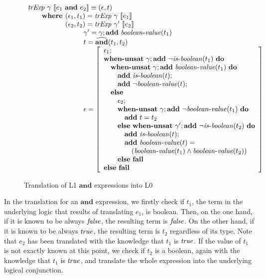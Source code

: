 \begin{figure}
\[
\begin{array}{l}
\trExp{\gamma}{\andE{e_1}{e_2}} \equiv (\epsilon, t)\\
\qquad \textbf{where }(\epsilon_1, t_1) = \trExp{\gamma}{e_1}\\
\qquad \phantom{\textbf{where }}(\epsilon_2, t_2) = \trExp{\gamma'}{e_2}\\
\qquad\qquad\qquad\qquad \gamma' = \gamma;\addE~\booleanvalue{t_1}\\
\qquad\qquad\qquad\qquad t = \widehat{\mathbf{and}}(t_1, t_2)\\
\qquad\qquad\qquad\qquad \epsilon = \left[ 
\begin{array}{l}
\epsilon_1;\\
\whenUnsatW~\gamma;\addE~\neg\isboolean{t_1}~\doW\\
\quad\whenUnsatW~\gamma;\addE~\booleanvalue{t_1}~\doW\\
\quad\quad\addE~\isboolean{t};\\
\quad\quad\addE~\neg\booleanvalue{t};\\
\quad\elseW\\
\quad\quad\epsilon_2;\\
\quad\quad\whenUnsatW~\gamma;\addE~\neg\booleanvalue{t_1}~\doW\\
\quad\quad\quad\addE~t = t_2\\
\quad\quad\elseW~\whenUnsatW~\gamma';\addE~\neg\isboolean{t_2}~\doW\\
\quad\quad\quad\addE~\isboolean{t};\\
\quad\quad\quad\addE~\booleanvalue{t} = \\
\quad\quad\quad\quad(\booleanvalue{t_1} \land \booleanvalue{t_2})\\
\quad\quad\elseW~\failE\\
\elseW~\failE
\end{array}
\right] \\
\end{array}
\]
\caption{Translation of L1 $\mathbf{and}$ expressions into L0}
\label{fig:andtr}
\end{figure}

In the translation for an $\mathbf{and}$ expression, we firstly check if $t_1$,
the term in the underlying logic that results of translating $e_1$, is boolean.
Then, on the one hand, if it is known to be always $\mathit{false}$, the resulting term
is $\mathit{false}$.  On the other hand, if it is known to be always $\mathit{true}$, the
resulting term is $t_2$ regardless of its type. Note that $e_2$ has been
translated with the knowledge that $t_1$ is $\mathit{true}$. If the value of $t_1$ is
not exactly known at this point, we check if $t_2$ is a boolean, again with the
knowledge that $t_1$ is $\mathit{true}$, and translate the whole expression into the
underlying logical conjunction.

